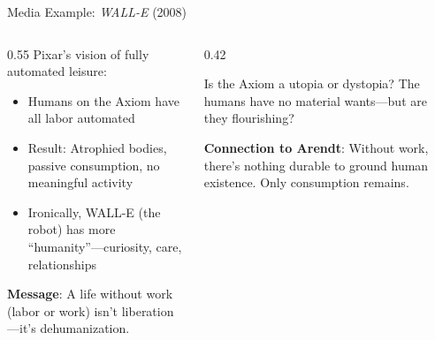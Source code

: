﻿\documentclass[aspectratio=169,11pt]{beamer}
\begin{document}
\begin{frame}{Media Example: \emph{WALL-E} (2008)}
\begin{columns}[T]
\begin{column}{0.55\textwidth}
Pixar's vision of fully automated leisure:
\begin{itemize}
    \item Humans on the Axiom have all labor automated
    \item Result: Atrophied bodies, passive consumption, no meaningful activity
    \item Ironically, WALL-E (the robot) has more ``humanity''---curiosity, care, relationships
\end{itemize}

\vspace{0.2em}
\textbf{Message}: A life without work (labor or work) isn't liberation---it's dehumanization.
\end{column}
\begin{column}{0.42\textwidth}
\begin{discussionbox}[Discussion]
\scriptsize
Is the Axiom a utopia or dystopia? The humans have no material wants---but are they flourishing?
\end{discussionbox}

\vspace{0.3em}
\textbf{Connection to Arendt}: Without work, there's nothing durable to ground human existence. Only consumption remains.
\end{column}
\end{columns}
\end{frame}
\end{document}
